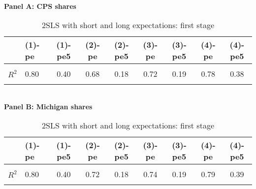 \begin{landscape}
\begin{table}[!htbp] \centering
\caption{2SLS with short and long expectations: first stage}
\label{tab:table:2sls:shortlong:stage1}
\textbf{Panel A: CPS shares} \\ 
\begin{tabular}[t]{>{}llccccccc}
\toprule
  & (1)-pe & (1)-pe5 & (2)-pe & (2)-pe5 & (3)-pe & (3)-pe5 & (4)-pe & (4)-pe5\\
\midrule
\textbf{\cellcolor{gray!10}{Cf.}} & \cellcolor{gray!10}{0.43 (0.03)} & \cellcolor{gray!10}{-0.27 (0.1)} & \cellcolor{gray!10}{1.35 (0.09)} & \cellcolor{gray!10}{0.65 (0.11)} & \cellcolor{gray!10}{1.48 (0.03)} & \cellcolor{gray!10}{0.62 (0.11)} & \cellcolor{gray!10}{0.26 (0.13)} & \cellcolor{gray!10}{-0.24 (0.1)}\\
\textbf{$R^2$} & 0.80 & 0.40 & 0.68 & 0.18 & 0.72 & 0.19 & 0.78 & 0.38\\
\textbf{\cellcolor{gray!10}{F}} & \cellcolor{gray!10}{12.17} & \cellcolor{gray!10}{4.13} & \cellcolor{gray!10}{261.22} & \cellcolor{gray!10}{46.66} & \cellcolor{gray!10}{315.11} & \cellcolor{gray!10}{45.74} & \cellcolor{gray!10}{5.37} & \cellcolor{gray!10}{4.43}\\
\bottomrule
\end{tabular} \vspace{5mm} 
\\ \textbf{Panel B: Michigan shares} \\ 
\begin{tabular}[t]{>{}llccccccc}
\toprule
  & (1)-pe & (1)-pe5 & (2)-pe & (2)-pe5 & (3)-pe & (3)-pe5 & (4)-pe & (4)-pe5\\
\midrule
\textbf{\cellcolor{gray!10}{Cf.}} & \cellcolor{gray!10}{0.24 (0.02)} & \cellcolor{gray!10}{-0.17 (0.06)} & \cellcolor{gray!10}{0.75 (0.02)} & \cellcolor{gray!10}{0.33 (0.04)} & \cellcolor{gray!10}{0.74 (0.02)} & \cellcolor{gray!10}{0.35 (0.04)} & \cellcolor{gray!10}{0.23 (0.02)} & \cellcolor{gray!10}{-0.19 (0.05)}\\
\textbf{$R^2$} & 0.80 & 0.40 & 0.72 & 0.18 & 0.74 & 0.19 & 0.79 & 0.39\\
\textbf{\cellcolor{gray!10}{F}} & \cellcolor{gray!10}{17.17} & \cellcolor{gray!10}{6.64} & \cellcolor{gray!10}{372.11} & \cellcolor{gray!10}{42.85} & \cellcolor{gray!10}{384.19} & \cellcolor{gray!10}{45.73} & \cellcolor{gray!10}{15.48} & \cellcolor{gray!10}{8.90}\\
\bottomrule
\end{tabular}\end{table}
\end{landscape}

